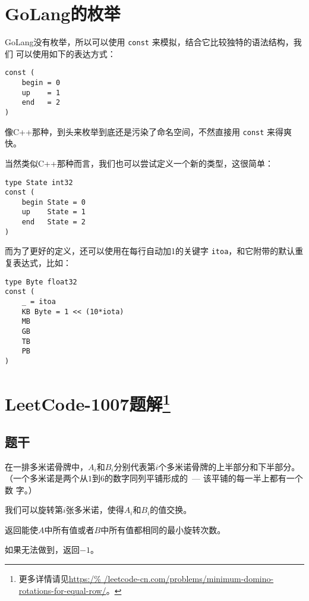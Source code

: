 

\section{GoLang的枚举}

GoLang没有枚举，所以可以使用 \verb|const| 来模拟，结合它比较独特的语法结构，我们
可以使用如下的表达方式：
\begin{lstlisting}
const (
    begin = 0
    up    = 1
    end   = 2
)
\end{lstlisting}

像C++那种，到头来枚举到底还是污染了命名空间，不然直接用 \verb|const| 来得爽快。

当然类似C++那种而言，我们也可以尝试定义一个新的类型，这很简单：
\begin{lstlisting}
type State int32
const (
    begin State = 0
    up    State = 1
    end   State = 2
)
\end{lstlisting}

而为了更好的定义，还可以使用在每行自动加1的关键字 \verb|itoa|，和它附带的默认重
复表达式，比如：
\begin{lstlisting}
type Byte float32
const (
    _ = itoa
    KB Byte = 1 << (10*iota)
    MB
    GB
    TB
    PB
)
\end{lstlisting}


\section[LeetCode-1007题解]{LeetCode-1007题解\footnote{更多详情请见\url{https:/%
/leetcode-cn.com/problems/minimum-domino-rotations-for-equal-row/}。}}

\subsection{题干}

在一排多米诺骨牌中，$A_i$和$B_i$分别代表第$i$个多米诺骨牌的上半部分和下半部分。
（一个多米诺是两个从$1$到$6$的数字同列平铺形成的 --- 该平铺的每一半上都有一个数
字。）

我们可以旋转第$i$张多米诺，使得$A_i$和$B_i$的值交换。

返回能使$A$中所有值或者$B$中所有值都相同的最小旋转次数。

如果无法做到，返回$-1$。

